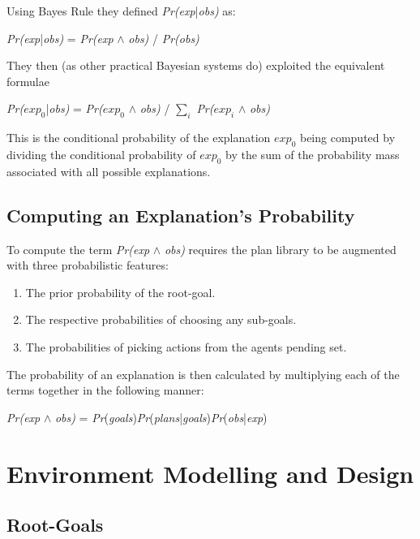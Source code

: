 \documentclass[parskip]{cs4rep}
\begin{document}
Using Bayes Rule they defined \textit{Pr(exp}|\textit{obs)} as:\newline

\centerline{
\textit{Pr(exp}|\textit{obs)} = \textit{Pr(exp} $\wedge$ \textit{obs)} / \textit{Pr(obs)}
}

They then (as other practical Bayesian systems do) exploited the equivalent formulae\newline

\centerline{
\textit{Pr($exp_0$}|\textit{obs)} = \textit{Pr($exp_0$} $\wedge$ \textit{obs)} / $\displaystyle\sum\nolimits_{i}$ \textit{Pr($exp_i$} $\wedge$ \textit{obs)}
}

This is the conditional probability of the explanation $exp_0$ being computed by dividing the conditional probability of $exp_0$  by the sum of the probability mass associated with all possible explanations.

\subsection{Computing an Explanation's Probability}

To compute the term \textit{Pr(exp} $\wedge$ \textit{obs)} requires the plan library to be augmented with three probabilistic features:\newline

\begin{enumerate}
\item
The prior probability of the root-goal.
\item
The respective probabilities of choosing any sub-goals.
\item
The probabilities of picking actions from the agents pending set.\newline
\end{enumerate}

The probability of an explanation is then calculated by multiplying each of the terms together in the following manner: \newline

\centerline{
\textit{Pr(exp} $\wedge$ \textit{obs)} = \textit{Pr}(\textit{goals})\textit{Pr}(\textit{plans}|\textit{goals})\textit{Pr}(\textit{obs}|\textit{exp})
}

\section{Environment Modelling and Design}

\subsection{Root-Goals}
\end{document}
